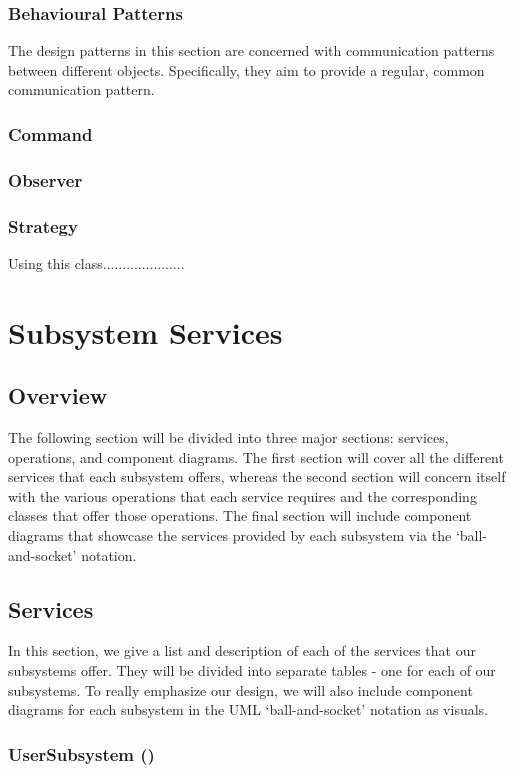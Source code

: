 \documentclass[12pt,letterpaper]{article}
\begin{document}
\subsubsection{Behavioural Patterns}
The design patterns in this section are concerned with communication patterns between different objects. Specifically, they aim to provide a regular, common communication pattern.
\subsubsection*{Command}
\subsubsection*{Observer}
\subsubsection*{Strategy}
Using this class.....................
\section{Subsystem Services}
\subsection{Overview}

The following section will be divided into three major sections: services, operations, and component diagrams. The first section will cover all the different services that each subsystem offers, whereas the second section will concern itself with the various operations that each service requires and the corresponding classes that offer those operations. The final section will include component diagrams that showcase the services provided by each subsystem via the `ball-and-socket' notation.

\subsection{Services}

In this section, we give a list and description of each of the services that our subsystems offer. They will be divided into separate tables - one for each of our subsystems. To really emphasize our design, we will also include component diagrams for each subsystem in the UML `ball-and-socket' notation as visuals.

\subsubsection{UserSubsystem ()}
\end{document}
